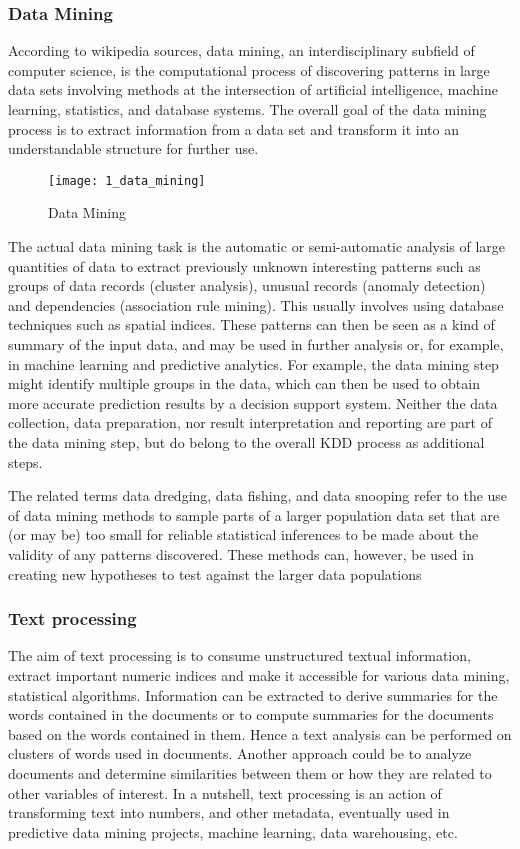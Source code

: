 \subsubsection{Data Mining}
According to wikipedia sources, data mining, an interdisciplinary subfield of computer science, is the computational process of discovering patterns in large data sets involving methods at the intersection of artificial intelligence, machine learning, statistics, and database systems. The overall goal of the data mining process is to extract information from a data set and transform it into an understandable structure for further use. \cite{wiki_data_mining}

\begin{figure}[!ht]
\centering
\texttt{[image: 1\_data\_mining]}
\caption{Data Mining}\label{data_mining}
\end{figure}

The actual data mining task is the automatic or semi-automatic analysis of large quantities of data to extract previously unknown interesting patterns such as groups of data records (cluster analysis), unusual records (anomaly detection) and dependencies (association rule mining). This usually involves using database techniques such as spatial indices. These patterns can then be seen as a kind of summary of the input data, and may be used in further analysis or, for example, in machine learning and predictive analytics. For example, the data mining step might identify multiple groups in the data, which can then be used to obtain more accurate prediction results by a decision support system. Neither the data collection, data preparation, nor result interpretation and reporting are part of the data mining step, but do belong to the overall KDD process as additional steps.

The related terms data dredging, data fishing, and data snooping refer to the use of data mining methods to sample parts of a larger population data set that are (or may be) too small for reliable statistical inferences to be made about the validity of any patterns discovered. These methods can, however, be used in creating new hypotheses to test against the larger data populations

\subsubsection{Text processing}
The aim of text processing is to consume unstructured textual information, extract important numeric indices and make it accessible for various data mining, statistical algorithms. Information can be extracted to derive summaries for the words contained in the documents or to compute summaries for the documents based on the words contained in them. Hence a text analysis can be performed on clusters of words used in documents. Another approach could be to analyze documents and determine similarities between them or how they are related to other variables of interest. In a nutshell, text processing is an action of transforming text into numbers, and other metadata, eventually used in predictive data mining projects, machine learning, data warehousing, etc.

